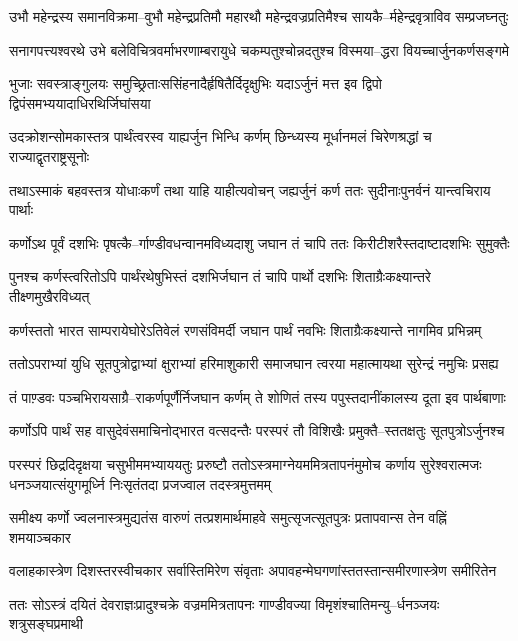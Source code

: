 \twolineshloka
{उभौ महेन्द्रस्य समानविक्रमा--वुभौ महेन्द्रप्रतिमौ महारथौ}
{महेन्द्रवज्रप्रतिमैश्च सायकै--र्महेन्द्रवृत्राविव सम्प्रजघ्नतुः}


\twolineshloka
{सनागपत्त्यश्वरथे उभे बलेविचित्रवर्माभरणाम्बरायुधे}
{चकम्पतुश्चोन्नदतुश्च विस्मया--द्धरा वियच्चार्जुनकर्णसङ्गमे}


\twolineshloka
{भुजाः सवस्त्राङ्गुलयः समुच्छ्रिताःससिंहनादैर्हृषितैर्दिदृक्षुभिः}
{यदाऽर्जुनं मत्त इव द्विपो द्विपंसमभ्ययादाधिरथिर्जिघांसया}


\twolineshloka
{उदक्रोशन्सोमकास्तत्र पार्थंत्वरस्व याह्यर्जुन भिन्धि कर्णम्}
{छिन्ध्यस्य मूर्धानमलं चिरेणश्रद्धां च राज्याद्वृतराष्ट्रसूनोः}


\twolineshloka
{तथाऽस्माकं बहवस्तत्र योधाःकर्णं तथा याहि याहीत्यवोचन्}
{जह्यर्जुनं कर्ण ततः सुदीनाःपुनर्वनं यान्त्वचिराय पार्थाः}


\twolineshloka
{कर्णोऽथ पूर्वं दशभिः पृषत्कै--र्गाण्डीवधन्वानमविध्यदाशु}
{जघान तं चापि ततः किरीटीशरैस्तदाष्टादशभिः सुमुक्तैः}


\twolineshloka
{पुनश्च कर्णस्त्वरितोऽपि पार्थंरथेषुभिस्तं दशभिर्जघान}
{तं चापि पार्थो दशभिः शिताग्रैःकक्ष्यान्तरे तीक्ष्णमुखैरविध्यत्}


\twolineshloka
{कर्णस्ततो भारत साम्परायेघोरेऽतिवेलं रणसंविमर्दी}
{जघान पार्थं नवभिः शिताग्रैःकक्ष्यान्ते नागमिव प्रभिन्नम्}


\twolineshloka
{ततोऽपराभ्यां युधि सूतपुत्रोद्वाभ्यां क्षुराभ्यां हरिमाशुकारी}
{समाजघान त्वरया महात्मायथा सुरेन्द्रं नमुचिः प्रसह्य}


\twolineshloka
{तं पाण़्डवः पञ्चभिरायसाग्रै--राकर्णपूर्णैर्निजघान कर्णम्}
{ते शोणितं तस्य पपुस्तदानींकालस्य दूता इव पार्थबाणाः}


\twolineshloka
{कर्णोऽपि पार्थं सह वासुदेवंसमाचिनोद्भारत वत्सदन्तैः}
{परस्परं तौ विशिखैः प्रमुक्तै--स्ततक्षतुः सूतपुत्रोऽर्जुनश्च}


परस्परं छिद्रदिदृक्षया चसुभीममभ्याययतुः प्ररुष्टौ
\twolineshloka
{ततोऽस्त्रमाग्नेयममित्रतापनंमुमोच कर्णाय सुरेश्वरात्मजः}
{धनञ्जयात्संयुगमूर्ध्नि निःसृतंतदा प्रजज्वाल तदस्त्रमुत्तमम्}


\twolineshloka
{समीक्ष्य कर्णो ज्वलनास्त्रमुद्यतंस वारुणं तत्प्रशमार्थमाहवे}
{समुत्सृजत्सूतपुत्रः प्रतापवान्स तेन वह्निं शमयाञ्चकार}


\twolineshloka
{वलाहकास्त्रेण दिशस्तरस्वीचकार सर्वास्तिमिरेण संवृताः}
{अपावहन्मेघगणांस्ततस्तान्समीरणास्त्रेण समीरितेन}


\twolineshloka
{ततः सोऽस्त्रं दयितं देवराज्ञःप्रादुश्चक्रे वज्रममित्रतापनः}
{गाण्डीवज्या विमृशंश्चातिमन्यु--र्धनञ्जयः शत्रुसङ्घप्रमाथी}



